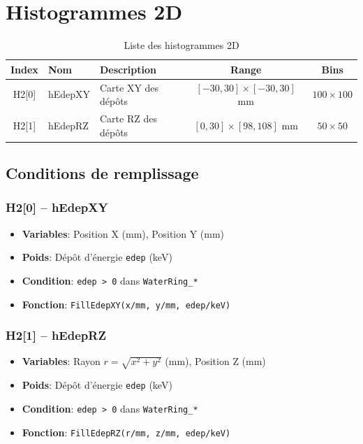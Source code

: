 \documentclass[11pt,a4paper]{article}
\begin{document}
\section{Histogrammes 2D}

\begin{table}[h]
\centering
\begin{tabular}{cllcc}
\toprule
\rowcolor{headerblue!20}
\textbf{Index} & \textbf{Nom} & \textbf{Description} & \textbf{Range} & \textbf{Bins} \\
\midrule
H2[0] & hEdepXY & Carte XY des dépôts & $[-30,30] \times [-30,30]$ mm & $100 \times 100$ \\
\rowcolor{lightgray}
H2[1] & hEdepRZ & Carte RZ des dépôts & $[0,30] \times [98,108]$ mm & $50 \times 50$ \\
\bottomrule
\end{tabular}
\caption{Liste des histogrammes 2D}
\end{table}

\subsection{Conditions de remplissage}

\subsubsection{H2[0] -- hEdepXY}
\begin{itemize}
    \item \textbf{Variables}: Position X (mm), Position Y (mm)
    \item \textbf{Poids}: Dépôt d'énergie \texttt{edep} (keV)
    \item \textbf{Condition}: \texttt{edep > 0} dans \texttt{WaterRing\_*}
    \item \textbf{Fonction}: \texttt{FillEdepXY(x/mm, y/mm, edep/keV)}
\end{itemize}

\subsubsection{H2[1] -- hEdepRZ}
\begin{itemize}
    \item \textbf{Variables}: Rayon $r = \sqrt{x^2+y^2}$ (mm), Position Z (mm)
    \item \textbf{Poids}: Dépôt d'énergie \texttt{edep} (keV)
    \item \textbf{Condition}: \texttt{edep > 0} dans \texttt{WaterRing\_*}
    \item \textbf{Fonction}: \texttt{FillEdepRZ(r/mm, z/mm, edep/keV)}
\end{itemize}
\end{document}
